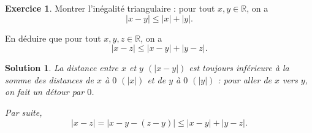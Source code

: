 \documentclass[a4paper, 14pt]{extarticle}
\theoremstyle{plain}
\newtheorem*{sol}{Solution}
\theoremstyle{definition}
\newtheorem{ex}{Exercice}
\newcommand{\R}{\mathbb{R}}
\newcommand{\exe}[2]{
		\begin{ex} #1  \end{ex}
		\begin{sol} #2 \end{sol}
	}
\newcommand{\exe}[2]{
		\begin{ex} #1  \end{ex}
	}
\begin{document}
\exe{
	Montrer l'inégalité triangulaire : pour tout $x,y \in \R$, on a
		\[ |x -  y| \leq |x| + | y|. \]
		
	En déduire que pour tout $x,y,z \in \R$, on a
		\[ |x - z| \leq |x-y| + |y - z|. \]
}
{
	La distance entre $x$ et $y$ $(|x-y|)$ est toujours inférieure à la somme des distances de $x$ à $0$ $(|x|)$ et de $y$ à $0$ $(|y|)$ : pour aller de $x$ vers $y$, on fait un détour par $0$.
	
	Par suite,
		\[ |x - z| = |x-y - (z-y)| \leq |x-y| + |y-z|. \]
}
\end{document}
